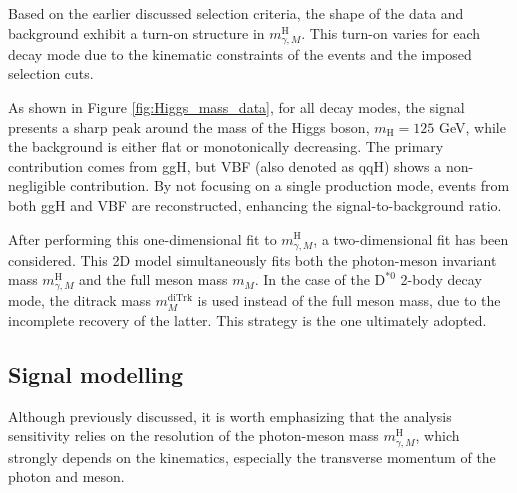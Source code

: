 Based on the earlier discussed selection criteria, the shape of the data and background exhibit a turn-on structure in $m^{\text{H}}_{\gamma, M}$. This turn-on varies for each decay mode due to the kinematic constraints of the events and the imposed selection cuts.

As shown in Figure \ref{fig:Higgs_mass_data}, for all decay modes, the signal presents a sharp peak around the mass of the Higgs boson, $m_{\text{H}}=125$ GeV, while the background is either flat or monotonically decreasing. The primary contribution comes from ggH, but VBF (also denoted as qqH) shows a non-negligible contribution. By not focusing on a single production mode, events from both ggH and VBF are reconstructed, enhancing the signal-to-background ratio.

After performing this one-dimensional fit to $m^{\text{H}}_{\gamma, M}$, a two-dimensional fit has been considered. This 2D model simultaneously fits both the photon-meson invariant mass $m^{\text{H}}_{\gamma, M}$ and the full meson mass $m_{M}$. In the case of the $\text{D}^{*0}$ 2-body decay mode, the ditrack mass $m^{\text{diTrk}}_{M}$ is used instead of the full meson mass, due to the incomplete recovery of the latter. This strategy is the one ultimately adopted.

\subsection{Signal modelling}\label{subsec:sgn_modelling}

Although previously discussed, it is worth emphasizing that the analysis sensitivity relies on the resolution of the photon-meson mass $m^{\text{H}}_{\gamma, M}$, which strongly depends on the kinematics, especially the transverse momentum of the photon and meson.

